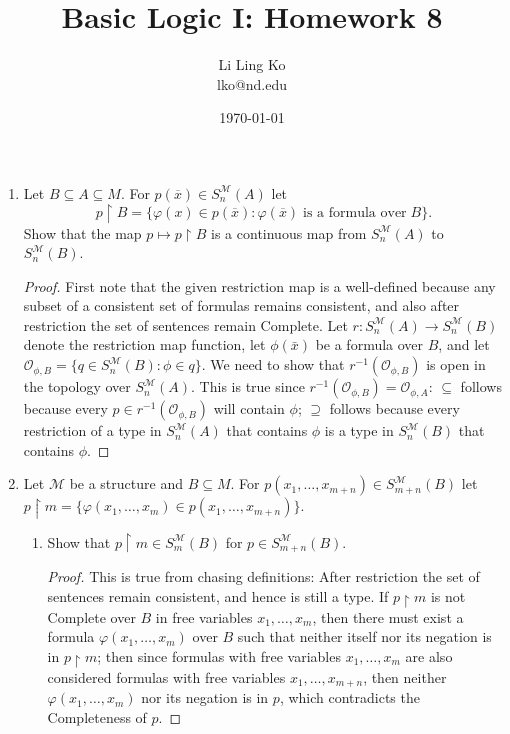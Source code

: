 \documentclass{article}
\begin{document}
\title{Basic Logic I: Homework 8}
\author{Li Ling Ko\\ lko@nd.edu}
\date{\today}
\maketitle

\begin{enumerate}[label={\bf Q\arabic*:}]
  \item Let $B\subseteq A\subseteq M$. For $p(\overline{x})\in
    S^{\mathcal{M}}_n(A)$ let \[p\restriction B=\{\varphi(x)\in
    p(\overline{x}):\varphi(\overline{x})\; \text{is a formula over}\;
    B\}.\] Show that the map $p\mapsto p\restriction B$ is a continuous
    map from $S^{\mathcal{M}}_n(A)$ to $S^{\mathcal{M}}_n(B)$.

    \begin{proof}
      First note that the given restriction map is a well-defined because
      any subset of a consistent set of formulas remains consistent, and also
      after restriction the set of sentences remain Complete. Let
      $r:S^{\mathcal{M}}_n(A)\rightarrow S^{\mathcal{M}}_n(B)$ denote the
      restriction map function, let $\phi(\bar{x})$ be a formula over $B$,
      and let $\mathcal{O}_{\phi,B}=\{q\in S^{\mathcal{M}}_n(B):\phi\in
      q\}$. We need to show that $r^{-1}(\mathcal{O}_{\phi,B})$ is open in
      the topology over $S^{\mathcal{M}}_n(A)$. This is true since
      $r^{-1}(\mathcal{O}_{\phi,B})=\mathcal{O}_{\phi,A}$: $\subseteq$
      follows because every $p\in r^{-1}(\mathcal{O}_{\phi,B})$ will
      contain $\phi$; $\supseteq$ follows because every restriction of a
      type in $S^{\mathcal{M}}_n(A)$ that contains $\phi$ is a type in
      $S^{\mathcal{M}}_n(B)$ that contains $\phi$.
    \end{proof}

  \item Let $\mathcal{M}$ be a structure and $B\subseteq M$. For
    $p(x_1,\ldots,x_{m+n})\in S^{\mathcal{M}}_{m+n}(B)$ let $p\restriction
    m=\{\varphi(x_1,\ldots,x_m)\in p(x_1,\ldots,x_{m+n})\}$.

    \begin{enumerate}
      \item Show that $p\restriction m\in S^{\mathcal{M}}_m(B)$ for $p\in
        S^{\mathcal{M}}_{m+n}(B)$.
        \begin{proof}
          This is true from chasing definitions: After restriction the set
          of sentences remain consistent, and hence is still a
          type. If $p\restriction m$ is not Complete over $B$ in
          free variables $x_1,\ldots,x_m$, then there must exist a formula
          $\varphi(x_1,\ldots,x_m)$ over $B$ such that neither itself nor
          its negation is in $p\restriction m$; then since formulas with
          free variables $x_1,\ldots,x_m$ are also considered formulas with
          free variables $x_1,\ldots,x_{m+n}$, then neither
          $\varphi(x_1,\ldots,x_m)$ nor its negation is in $p$, which
          contradicts the Completeness of $p$.
        \end{proof}


\end{enumerate}
\end{enumerate}
\end{document}
